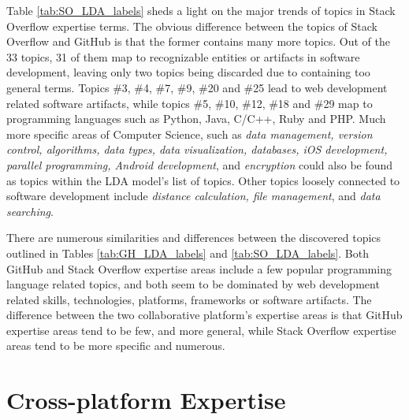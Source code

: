             Table \ref{tab:SO_LDA_labels} sheds a light on the major trends of topics in Stack Overflow expertise terms. The obvious difference between the topics of Stack Overflow and GitHub is that the former contains many more topics. Out of the 33 topics, 31 of them map to recognizable entities or artifacts in software development, leaving only two topics being discarded due to containing too general terms. Topics \#3, \#4, \#7, \#9, \#20 and \#25 lead to web development related software artifacts, while topics \#5, \#10, \#12, \#18 and \#29 map to programming languages such as Python, Java, C/C++, Ruby and PHP. Much more specific areas of Computer Science, such as \emph{data management, version control, algorithms, data types, data visualization, databases, iOS development, parallel programming, Android development}, and \emph{encryption} could also be found as topics within the LDA model's list of topics. Other topics loosely connected to software development include \emph{distance calculation, file management}, and \emph{data searching}.
            
            There are numerous similarities and differences between the discovered topics outlined in Tables \ref{tab:GH_LDA_labels} and \ref{tab:SO_LDA_labels}. Both GitHub and Stack Overflow expertise areas include a few popular programming language related topics, and both seem to be dominated by web development related skills, technologies, platforms, frameworks or software artifacts. The difference between the two collaborative platform's expertise areas is that GitHub expertise areas tend to be few, and more general, while Stack Overflow expertise areas tend to be more specific and numerous.  \\
        
    
    \section{Cross-platform Expertise\label{sec:results_rq2}}
        
